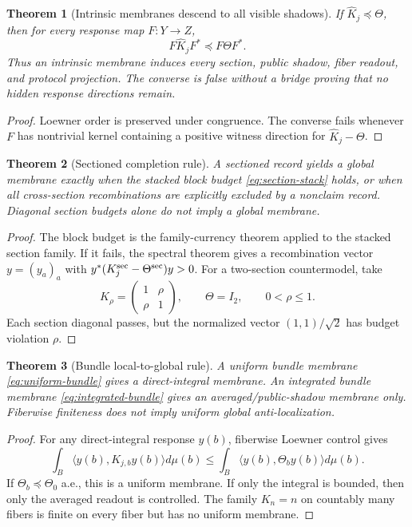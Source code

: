 \documentclass[11pt]{article}
\newtheorem{theorem}{Theorem}[section]
\begin{document}
\begin{theorem}[Intrinsic membranes descend to all visible shadows]\label{thm:intrinsic-descends}
If \(\widehat K_j\preceq\Theta\), then for every response map \(F:Y\to Z\),
\[
  F\widehat K_jF^*\preceq F\Theta F^*.
\]
Thus an intrinsic membrane induces every section, public shadow, fiber readout, and protocol projection. The converse is false without a bridge proving that no hidden response directions remain.
\end{theorem}
\begin{proof}
Loewner order is preserved under congruence. The converse fails whenever \(F\) has nontrivial kernel containing a positive witness direction for \(\widehat K_j-\Theta\).
\end{proof}

\begin{theorem}[Sectioned completion rule]\label{thm:sectioned-completion}
A sectioned record yields a global membrane exactly when the stacked block budget \eqref{eq:section-stack} holds, or when all cross-section recombinations are explicitly excluded by a nonclaim record. Diagonal section budgets alone do not imply a global membrane.
\end{theorem}
\begin{proof}
The block budget is the family-currency theorem applied to the stacked section family. If it fails, the spectral theorem gives a recombination vector \(y=(y_a)_a\) with \(y^*(K_j^{\rm sec}-\Theta^{\rm sec})y>0\). For a two-section countermodel, take
\[
  K_\rho=\begin{pmatrix}1&\rho\\ \rho&1\end{pmatrix},\qquad\Theta=I_2,
  \qquad 0<\rho\le1.
\]
Each section diagonal passes, but the normalized vector \((1,1)/\sqrt2\) has budget violation \(\rho\).
\end{proof}

\begin{theorem}[Bundle local-to-global rule]\label{thm:bundle-global}
A uniform bundle membrane \eqref{eq:uniform-bundle} gives a direct-integral membrane. An integrated bundle membrane \eqref{eq:integrated-bundle} gives an averaged/public-shadow membrane only. Fiberwise finiteness does not imply uniform global anti-localization.
\end{theorem}
\begin{proof}
For any direct-integral response \(y(b)\), fiberwise Loewner control gives
\[
 \int_B\langle y(b),K_{j,b}y(b)\rangle d\mu(b)
 \le
 \int_B\langle y(b),\Theta_by(b)\rangle d\mu(b).
\]
If \(\Theta_b\preceq\Theta_0\) a.e., this is a uniform membrane. If only the integral is bounded, then only the averaged readout is controlled. The family \(K_n=n\) on countably many fibers is finite on every fiber but has no uniform membrane.
\end{proof}
\end{document}
